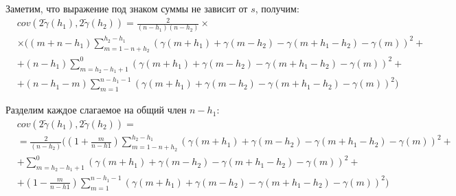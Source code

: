 Заметим, что выражение под знаком суммы не зависит от $s$, получим:
\begin{eqnarray*}
\nonumber
	& cov(2 \tilde{\gamma}(h_1), 2 \tilde{\gamma}(h_2)) = \frac{2}{(n - h_1) (n - h_2)} \times \\
	& \times ((m + n - h_1)\sum_{m = 1 - n + h_2}^{h_2 - h_1}(\gamma(m + h_1) + \gamma(m - h_2) - \gamma(m + h_1 - h_2) - \gamma(m))^2 + \\
	& + (n - h_1)\sum_{m = h_2 - h_1 + 1}^{0}(\gamma(m + h_1) + \gamma(m - h_2) - \gamma(m + h_1 - h_2) - \gamma(m))^2 + \\
	& + (n - h_1 - m)\sum_{m = 1}^{n - h_1 - 1}(\gamma(m + h_1) + \gamma(m - h_2) - \gamma(m + h_1 - h_2) - \gamma(m))^2)
\end{eqnarray*}

Разделим каждое слагаемое на общий член $n - h_1$:
\begin{eqnarray*}
\nonumber
	& cov(2 \tilde{\gamma}(h_1), 2 \tilde{\gamma}(h_2)) = \\ 
	& = \frac{2}{(n - h_2)} ((1 + \frac{m}{n - h1})\sum_{m = 1 - n + h_2}^{h_2 - h_1}(\gamma(m + h_1) + \gamma(m - h_2) - \gamma(m + h_1 - h_2) - \gamma(m))^2 + \\
	& + \sum_{m = h_2 - h_1 + 1}^{0}(\gamma(m + h_1) + \gamma(m - h_2) - \gamma(m + h_1 - h_2) - \gamma(m))^2 + \\
	& + (1 - \frac{m}{n - h1})\sum_{m = 1}^{n - h_1 - 1}(\gamma(m + h_1) + \gamma(m - h_2) - \gamma(m + h_1 - h_2) - \gamma(m))^2)
\end{eqnarray*}

